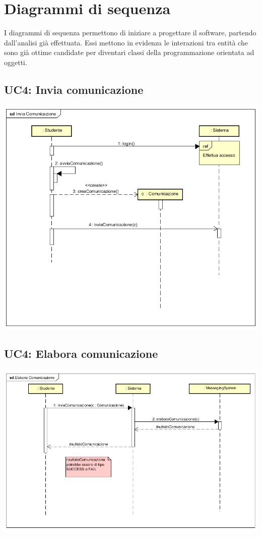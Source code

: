 \documentclass[12pt]{report}
\begin{document}
	
	
	\newpage
	
	
	\section{Diagrammi di sequenza}
	
	I diagrammi di sequenza permettono di iniziare a progettare il software, partendo dall'analisi già effettuata. Essi mettono in evidenza le interazioni tra entità che sono già ottime candidate per diventari classi della programmazione orientata ad oggetti.
	
	\subsection{UC4: Invia comunicazione}
	\begin{center}
		\includegraphics{./images/InviaComunicazione.png}
	\end{center}
	
	\subsection{UC4: Elabora comunicazione}
	\begin{center}
		\includegraphics[scale = 0.8]{./images/ElaboraComunicazione.png}
	\end{center}
	
\end{document}
